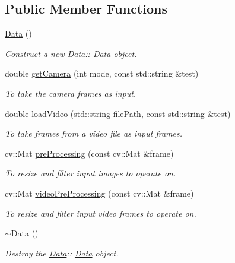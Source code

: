 \subsection*{Public Member Functions}
\begin{DoxyCompactItemize}
\item 
\mbox{\label{classData_af11f741cb7f587e2e495452a8905a22a}} 
\hyperlink{classData_af11f741cb7f587e2e495452a8905a22a}{Data} ()
\begin{DoxyCompactList}\small\item\em Construct a new \hyperlink{classData}{Data}\+:\+: \hyperlink{classData}{Data} object. \end{DoxyCompactList}\item 
double \hyperlink{classData_ab632c5dd4acbd86dba0921210aa7139d}{get\+Camera} (int mode, const std\+::string \&test)
\begin{DoxyCompactList}\small\item\em To take the camera frames as input. \end{DoxyCompactList}\item 
double \hyperlink{classData_a0a8569daf0e938c6793c3241fc1f9023}{load\+Video} (std\+::string file\+Path, const std\+::string \&test)
\begin{DoxyCompactList}\small\item\em To take frames from a video file as input frames. \end{DoxyCompactList}\item 
cv\+::\+Mat \hyperlink{classData_a8791dd62b1f57b4e4f2039e934ec7fdf}{pre\+Processing} (const cv\+::\+Mat \&frame)
\begin{DoxyCompactList}\small\item\em To resize and filter input images to operate on. \end{DoxyCompactList}\item 
cv\+::\+Mat \hyperlink{classData_ab0eefc277a688a36ec7bef63e8807bc2}{video\+Pre\+Processing} (const cv\+::\+Mat \&frame)
\begin{DoxyCompactList}\small\item\em To resize and filter input video frames to operate on. \end{DoxyCompactList}\item 
\mbox{\label{classData_aab31956423290f0d62dcca47ab4d16dd}} 
\hyperlink{classData_aab31956423290f0d62dcca47ab4d16dd}{$\sim$\+Data} ()
\begin{DoxyCompactList}\small\item\em Destroy the \hyperlink{classData}{Data}\+:\+: \hyperlink{classData}{Data} object. \end{DoxyCompactList}\end{DoxyCompactItemize}
